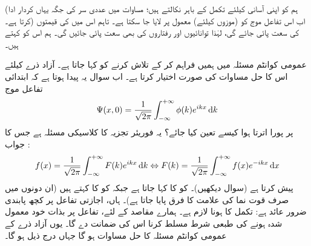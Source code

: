(ہم  کو اپنی آسانی کیلئے تکمل کے باہر نکالتے ہیں؛ مساوات 
  میں عددی سر  کی جگہ یہاں  کردار ادا کرتا ہے۔) اب اس تفاعل موج کو (موزوں  کیلئے) معمول پر لایا جا سکتا ہے۔ تاہم اس میں  کی قیمتوں کی سعت پائی جائے گی، لہٰذا توانائیوں اور رفتاروں کی بھی سعت پائی جائیں گی۔ ہم اس کو  کہتے ہیں۔

عمومی کوانٹم مسئلہ میں ہمیں  فراہم کر کے  تلاش کرنے کو کہا جاتا ہے۔ آزاد ذرے کیلئے اس کا حل مساوات  کی صورت اختیار کرتا ہے۔ اب سوال یہ پیدا ہوتا ہے کہ ابتدائی تفاعل موج 
\begin{align}
\Psi (x,0) = \frac{1}{\sqrt{2\pi}} \int_{- \infty}^{+ \infty} \phi (k) e^{ikx} \dif k
\end{align}
پر پورا اترتا ہوا  کیسے تعین کیا جائے؟ یہ فوریئر تجزیہ کا کلاسیکی مسئلہ ہے جس کا جواب : 
\begin{align}
f(x) = \frac{1}{\sqrt{2\pi}} \int_{- \infty}^{+ \infty} F(k) e^{ikx} \dif k \Leftrightarrow F(k) = \frac{1}{\sqrt{2\pi}} \int_{- \infty}^{+ \infty} f(x) e^{-ikx} \dif x
\end{align}
 پیش کرتا ہے (سوال  دیکھیں)۔  کو  کا  کہا جاتا ہے جبکہ  کو  کا  کہتے ہیں (ان دونوں میں صرف قوت نما کی علامت کا فرق پایا جاتا ہے)۔ ہاں، اجازتی تفاعل پر کچھ پابندی ضرور عائد ہے: تکمل کا  ہونا لازم ہے۔ ہمارے مقاصد کے لئے، تفاعل  پر بذات خود معمول شدہ ہونے کی طبعی شرط مسلط کرنا اس کی ضمانت دے گا۔ یوں آزاد ذرے کے عمومی کوانٹم مسئلہ کا حل مساوات  ہو گا جہاں  درج ذیل ہو گا۔ 
